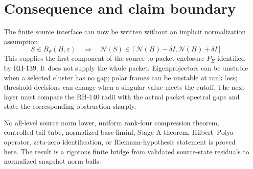 \documentclass[12pt]{article}
\begin{document}
\section{Consequence and claim boundary}
The finite source interface can now be written without an implicit
normalization assumption:
\[
 S\in B_F(H,\varepsilon)
 \quad\Longrightarrow\quad
 \mathcal N(S)\in
 [\mathcal N(H)-\delta I,\mathcal N(H)+\delta I].
\]
This supplies the first component of the source-to-packet enclosure $P_E$
identified by RH-139.  It does not supply the whole packet.  Eigenprojectors
can be unstable when a selected cluster has no gap; polar frames can be
unstable at rank loss; threshold decisions can change when a singular value
meets the cutoff.  The next layer must compare the RH-140 radii with the
actual packet spectral gaps and state the corresponding obstruction sharply.

No all-level source norm lower, uniform rank-four compression theorem,
controlled-tail tube, normalized-base liminf, Stage A theorem,
Hilbert--Polya operator, zeta-zero identification, or Riemann-hypothesis
statement is proved here.  The result is a rigorous finite bridge from
validated source-state residuals to normalized snapshot norm balls.



\end{document}
